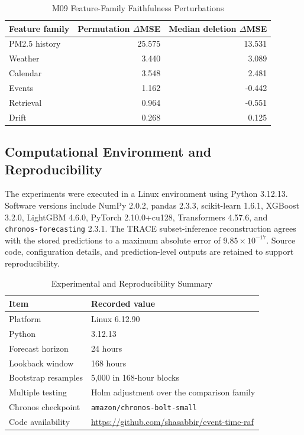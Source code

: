 \documentclass{ieeeaccess}
\begin{document}
\begin{table}[!t]
\centering
\caption{M09 Feature-Family Faithfulness Perturbations}
\label{tab:faithfulness}
\begin{tabular}{lrr}
\toprule
Feature family & Permutation $\Delta$MSE & Median deletion $\Delta$MSE \\
\midrule
PM2.5 history & 25.575 & 13.531 \\
Weather & 3.440 & 3.089 \\
Calendar & 3.548 & 2.481 \\
Events & 1.162 & -0.442 \\
Retrieval & 0.964 & -0.551 \\
Drift & 0.268 & 0.125 \\
\bottomrule
\end{tabular}
\end{table}

\subsection{Computational Environment and Reproducibility}

The experiments were executed in a Linux environment using Python 3.12.13.
Software versions include NumPy 2.0.2, pandas 2.3.3, scikit-learn 1.6.1, XGBoost 3.2.0,
LightGBM 4.6.0, PyTorch 2.10.0+cu128, Transformers 4.57.6, and
\texttt{chronos-forecasting} 2.3.1. The TRACE subset-inference reconstruction
agrees with the stored predictions to a maximum absolute error of
$9.85\times10^{-17}$. Source code, configuration details, and prediction-level
outputs are retained to support reproducibility.

\begin{table}[!t]
\centering
\caption{Experimental and Reproducibility Summary}
\label{tab:compute_summary}
\begin{tabular}{ll}
\toprule
Item & Recorded value \\
\midrule
Platform & Linux 6.12.90 \\
Python & 3.12.13 \\
Forecast horizon & 24 hours \\
Lookback window & 168 hours \\
Bootstrap resamples & 5,000 in 168-hour blocks \\
Multiple testing & Holm adjustment over the comparison family \\
Chronos checkpoint & \texttt{amazon/chronos-bolt-small} \\
Code availability & \url{https://github.com/shasabbir/event-time-raf} \\
\bottomrule
\end{tabular}
\end{table}
\end{document}
